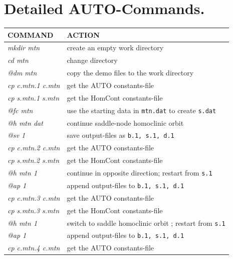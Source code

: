\documentclass[12pt]{report}
\begin{document}
\section{ Detailed {\cal AUTO}-Commands.}
\begin{table}[htbp]
\begin{center}
\begin{tabular}{| l | l |}
\hline
  COMMAND  & ACTION \\
\hline
  {\it mkdir mtn} & create an empty work directory \\ 
  {\it cd mtn} & change directory \\
  {\it @dm mtn} & copy the demo files to the work directory \\
\hline
  {\it cp c.mtn.1 c.mtn} & get the AUTO constants-file \\ 
  {\it cp s.mtn.1 s.mtn} & get the HomCont constants-file \\ 
  {\it @fc mtn} & use the starting data in {\tt mtn.dat} to create {\tt s.dat} \\ 
  {\it @h mtn dat} &  continue saddle-node homoclinic orbit\\
  {\it @sv 1} & save output-files as {\tt b.1, s.1, d.1} \\ 
\hline
  {\it cp c.mtn.2 c.mtn} & get the AUTO constants-file \\ 
  {\it cp s.mtn.2 s.mtn} & get the HomCont constants-file \\ 
  {\it @h mtn 1} & continue in opposite direction; restart from {\tt s.1} \\ 
  {\it @ap 1} & append output-files to {\tt b.1, s.1, d.1} \\ 
\hline
  {\it cp c.mtn.3 c.mtn} & get the AUTO constants-file \\ 
  {\it cp s.mtn.3 s.mtn} & get the HomCont constants-file \\ 
  {\it @h mtn 1} & switch to saddle homoclinic orbit  ; restart from {\tt s.1} \\ 
  {\it @ap 1} & append output-files to {\tt b.1, s.1, d.1} \\ 
\hline
  {\it cp c.mtn.4 c.mtn} & get the AUTO constants-file \\ 

\end{tabular}
\end{center}
\end{table}
\end{document}
